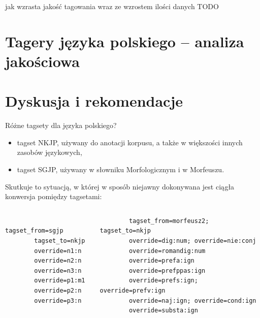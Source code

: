 \documentclass{beamer}
\begin{document}
\begin{frame}{jak wzrasta jakość tagowania wraz ze wzrostem ilości danych}
  TODO
\end{frame}


\section{Tagery języka polskiego -- analiza jakościowa}
\frame{\sectionpage}

\section{Dyskusja i rekomendacje}
\frame{\sectionpage}

\begin{frame}[fragile]{Różne tagsety dla języka polskiego?}
  \begin{itemize}
    \item tagset NKJP, używany do anotacji korpusu, a także w większości innych zasobów językowych,
    \item tagset SGJP, używany w słowniku Morfologicznym i w Morfeuszu.
  \end{itemize}
  \vspace{0.5cm}

  Skutkuje to sytuacją, w której w sposób niejawny dokonywana jest ciągła konwersja pomiędzy tagsetami:
  \begin{columns}[c]
      \footnotesize
      \begin{verbatim}
        tagset_from=sgjp
        tagset_to=nkjp
        override=n1:n
        override=n2:n
        override=n3:n
        override=p1:m1
        override=p2:n
        override=p3:n
      \end{verbatim}
      \footnotesize
      \begin{verbatim}
        tagset_from=morfeusz2; tagset_to=nkjp
        override=dig:num; override=nie:conj
        override=romandig:num
        override=prefa:ign
        override=prefppas:ign
        override=prefs:ign; override=prefv:ign
        override=naj:ign; override=cond:ign
        override=substa:ign
      \end{verbatim}
    \end{columns}
\end{frame}
\end{document}
